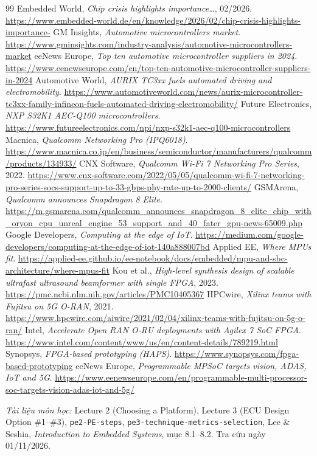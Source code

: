 \documentclass[11pt,a4paper]{article}
\begin{document}
\begin{thebibliography}{99}
 Embedded World, \emph{Chip crisis highlights importance\ldots}, 02/2026. \url{https://www.embedded-world.de/en/knowledge/2026/02/chip-crisis-highlights-importance-}
 GM Insights, \emph{Automotive microcontrollers market}. \url{https://www.gminsights.com/industry-analysis/automotive-microcontrollers-market}
 eeNews Europe, \emph{Top ten automotive microcontroller suppliers in 2024}. \url{https://www.eenewseurope.com/en/top-ten-automotive-microcontroller-suppliers-in-2024}
 Automotive World, \emph{AURIX TC3xx fuels automated driving and electromobility}. \url{https://www.automotiveworld.com/news/aurix-microcontroller-tc3xx-family-infineon-fuels-automated-driving-electromobility/}
 Future Electronics, \emph{NXP S32K1 AEC-Q100 microcontrollers}. \url{https://www.futureelectronics.com/npi/nxp-s32k1-aec-q100-microcontrollers}
 Macnica, \emph{Qualcomm Networking Pro (IPQ6018)}. \url{https://www.macnica.co.jp/en/business/semiconductor/manufacturers/qualcomm/products/134933/}
 CNX Software, \emph{Qualcomm Wi-Fi 7 Networking Pro Series}, 2022. \url{https://www.cnx-software.com/2022/05/05/qualcomm-wi-fi-7-networking-pro-series-socs-support-up-to-33-gbps-phy-rate-up-to-2000-clients/}
 GSMArena, \emph{Qualcomm announces Snapdragon 8 Elite}. \url{https://m.gsmarena.com/qualcomm_announces_snapdragon_8_elite_chip_with_oryon_cpu_unreal_engine_53_support_and_40_fater_gpu-news-65009.php}
 Google Developers, \emph{Computing at the edge of IoT}. \url{https://medium.com/google-developers/computing-at-the-edge-of-iot-140a888007bd}
 Applied EE, \emph{Where MPUs fit}. \url{https://applied-ee.github.io/ee-notebook/docs/embedded/mpu-and-sbc-architecture/where-mpus-fit}
 Kou et al., \emph{High-level synthesis design of scalable ultrafast ultrasound beamformer with single FPGA}, 2023. \url{https://pmc.ncbi.nlm.nih.gov/articles/PMC10405367}
 HPCwire, \emph{Xilinx teams with Fujitsu on 5G O-RAN}, 2021. \url{https://www.hpcwire.com/aiwire/2021/02/04/xilinx-teams-with-fujitsu-on-5g-o-ran/}
 Intel, \emph{Accelerate Open RAN O-RU deployments with Agilex 7 SoC FPGA}. \url{https://www.intel.com/content/www/us/en/content-details/789219.html}
 Synopsys, \emph{FPGA-based prototyping (HAPS)}. \url{https://www.synopsys.com/fpga-based-prototyping}
 eeNews Europe, \emph{Programmable MPSoC targets vision, ADAS, IoT and 5G}. \url{https://www.eenewseurope.com/en/programmable-multi-processor-soc-targets-vision-adas-iot-and-5g/}
\end{thebibliography}

\noindent\small\textit{Tài liệu môn học:} Lecture 2 (Choosing a Platform), Lecture 3 (ECU Design Option \#1–\#3), \texttt{pe2-PE-steps}, \texttt{pe3-technique-metrics-selection}, Lee \& Seshia, \emph{Introduction to Embedded Systems}, mục 8.1–8.2. Tra cứu ngày 01/11/2026.
\end{document}

